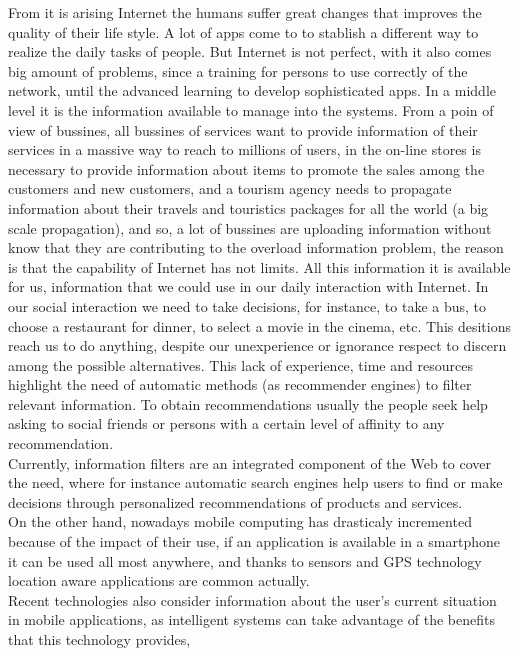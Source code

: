 From it is arising Internet the humans suffer great changes
that improves the quality of their life style. A lot of apps come to 
to stablish a different way to realize the daily tasks of people.
But Internet is not perfect, with it also comes big amount of problems, 
since a training for persons to use correctly of the network, until the
advanced learning to develop sophisticated apps. In a middle level
it is the information available to manage into the systems. 
From a poin of view of bussines, all bussines of services want 
to provide information of their services in a massive way to reach
to millions of users, 
in the on-line stores is necessary to provide information about 
items to promote the sales among the customers 
and new customers, and a tourism agency needs to propagate
information about their travels and touristics packages for all
the world (a big scale propagation), and so, a lot of 
bussines are uploading 
information without know that they are contributing to 
the overload information problem, 
the reason is that the capability of Internet has not limits.
All this information it is available for us, information that 
we could use in our daily interaction with Internet.
In our social interaction we need to take decisions, 
for instance, to take a bus, to choose a restaurant for dinner,
to select a movie in the cinema, etc. This desitions reach us to 
do anything,  despite our unexperience or ignorance respect to
discern among the possible alternatives.
This lack of experience, time and resources 
highlight the need of automatic methods (as recommender engines) 
to filter relevant information.
To obtain recommendations usually the people seek help 
asking to social friends or persons with a certain 
level of affinity to any recommendation.\\
Currently, information filters are
an integrated component of the Web to cover the need, 
where for instance
automatic search engines help users to find or make 
decisions through personalized recommendations
of products and services. \\ 
On the other hand, nowadays mobile computing has drasticaly 
incremented because of the impact of their use, if an application 
is available in a smartphone it can be used all most anywhere, 
and thanks to sensors and GPS technology location aware 
applications are common actually.\\ 
Recent technologies also consider information about the user's 
current situation in mobile applications, as intelligent systems 
can take advantage of the benefits that this technology provides, 
